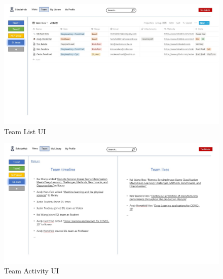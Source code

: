 \begin{figure}[htp]
	\centering
	\includegraphics[width=\textwidth]{./img/UI teamlist.jpg}
	\caption{Team List UI}
	\label{teamlist UI}
\end{figure}

\begin{figure}[htp]
	\centering
	\includegraphics[width=\textwidth]{./img/UITeamactivity.jpg}
	\caption{Team Activity UI}
	\label{Teamactivity UI}
\end{figure}